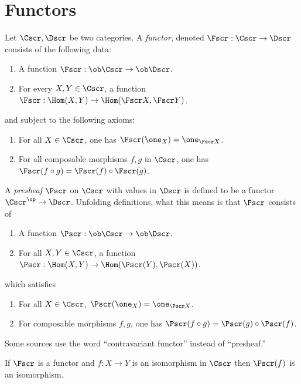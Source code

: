 \section{Functors}

Let $\Cscr, \Dscr$ be two categories.
A \emph{functor}, denoted $\Fscr : \Cscr \to \Dscr$ consists of the following data:
\begin{enumerate}
  \item A function $\Fscr : \ob \Cscr \to \ob \Dscr$.
  \item For every $X,Y \in \Cscr$, a function $\Fscr : \Hom(X,Y) \to \Hom(\Fscr X, \Fscr Y)$.
\end{enumerate}
and subject to the following axioms:
\begin{enumerate}
  \item For all $X \in \Cscr$, one has $\Fscr(\one_{X}) = \one_{\Fscr X}$.
  \item For all composable morphisms $f,g$ in $\Cscr$, one has $\Fscr(f \circ g) = \Fscr(f) \circ \Fscr(g)$.
\end{enumerate}

A \emph{presheaf} $\Pscr$ on $\Cscr$ with values in $\Dscr$ is defined to be a functor $\Cscr^{\op} \to \Dscr$.
Unfolding definitions, what this means is that $\Pscr$ consists of
\begin{enumerate}
  \item A function $\Pscr : \ob\Cscr \to \ob \Dscr$.
  \item For all $X,Y \in \Cscr$, a function $\Pscr : \Hom(X,Y) \to \Hom(\Pscr(Y),\Pscr(X))$.
\end{enumerate}
which satisfies
\begin{enumerate}
  \item For all $X \in \Cscr$, $\Pscr(\one_{X}) = \one_{\Pscr X}$.
  \item For composable morphisms $f,g$, one has $\Pscr(f \circ g) = \Pscr(g) \circ \Pscr(f)$.
\end{enumerate}
Some sources use the word ``contravariant functor'' instead of ``presheaf.''

\begin{exercise}
  If $\Fscr$ is a functor and $f : X \to Y$ is an isomorphism in $\Cscr$ then $\Fscr(f)$ is an isomorphism.
\end{exercise}

